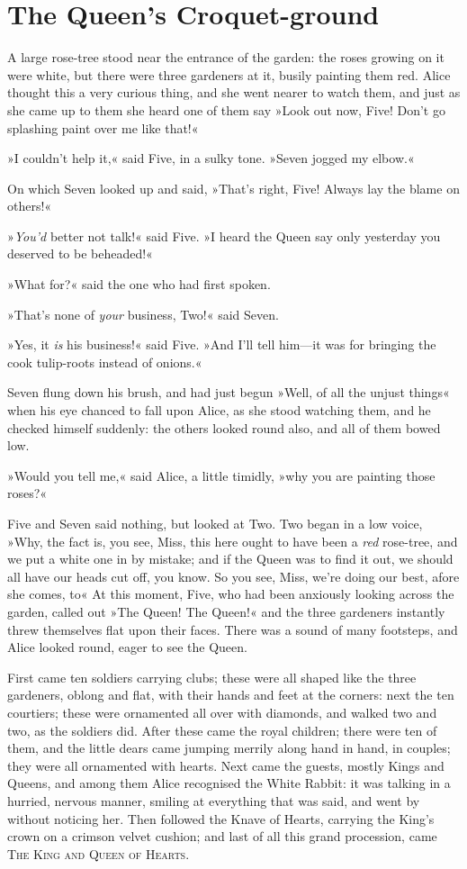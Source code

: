 \chapter{The Queen's Croquet-ground}

\lettrine[lines=4,findent=2pt]{A}{} large rose-tree stood near the entrance of the garden: the roses growing on it were white, but there were three gardeners at it, busily painting them red. Alice thought this a very curious thing, and she went nearer to watch them, and just as she came up to them she heard one of them say »Look out now, Five! Don't go splashing paint over me like that!«

»I couldn't help it,« said Five, in a sulky tone. »Seven jogged my elbow.«

On which Seven looked up and said, »That's right, Five! Always lay the blame on others!«

»\textit{You'd} better not talk!« said Five. »I heard the Queen say only yesterday you deserved to be beheaded!«

»What for?« said the one who had first spoken.

»That's none of \textit{your} business, Two!« said Seven.

»Yes, it \textit{is} his business!« said Five. »And I'll tell him—it was for bringing the cook tulip-roots instead of onions.«

Seven flung down his brush, and had just begun »Well, of all the unjust things\longdash« when his eye chanced to fall upon Alice, as she stood watching them, and he checked himself suddenly: the others looked round also, and all of them bowed low.

»Would you tell me,« said Alice, a little timidly, »why you are painting those roses?«

Five and Seven said nothing, but looked at Two. Two began in a low voice, »Why, the fact is, you see, Miss, this here ought to have been a \textit{red} rose-tree, and we put a white one in by mistake; and if the Queen was to find it out, we should all have our heads cut off, you know. So you see, Miss, we're doing our best, afore she comes, to\longdash« At this moment, Five, who had been anxiously looking across the garden, called out »The Queen! The Queen!« and the three gardeners instantly threw themselves flat upon their faces. There was a sound of many footsteps, and Alice looked round, eager to see the Queen.

First came ten soldiers carrying clubs; these were all shaped like the three gardeners, oblong and flat, with their hands and feet at the corners: next the ten courtiers; these were ornamented all over with diamonds, and walked two and two, as the soldiers did. After these came the royal children; there were ten of them, and the little dears came jumping merrily along hand in hand, in couples; they were all ornamented with hearts. Next came the guests, mostly Kings and Queens, and among them Alice recognised the White Rabbit: it was talking in a hurried, nervous manner, smiling at everything that was said, and went by without noticing her. Then followed the Knave of Hearts, carrying the King's crown on a crimson velvet cushion; and last of all this grand procession, came \textsc{The King and Queen of Hearts}.

